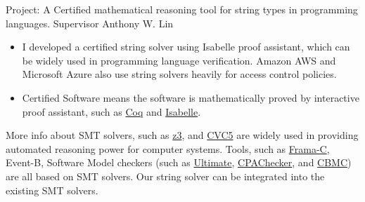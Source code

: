 \documentclass[a4paper,10pt]{memoir} %
\begin{document}


{
Project: A Certified mathematical reasoning tool for string types in programming languages. Supervisor Anthony W. Lin
\begin{itemize}
	
	\item I developed a certified string solver using Isabelle  proof assistant, which can be widely used in programming language verification. Amazon AWS and Microsoft Azure also use string solvers heavily for access control policies.

\item Certified Software means the software is mathematically proved by interactive proof assistant, such as \href{https://coq.inria.fr/}{Coq} and \href{https://isabelle.in.tum.de/}{Isabelle}. 
	

\end{itemize}

More info about
SMT solvers, such as \href{https://github.com/Z3Prover/z3}{z3}, and \href{https://cvc5.github.io/}{CVC5} are widely used in providing automated reasoning power for computer systems. Tools, such as \href{https://frama-c.com/}{Frama-C},  Event-B,  Software Model checkers (such as \href{https://monteverdi.informatik.uni-freiburg.de/tomcat/Website/}{Ultimate}, 
\href{https://cpachecker.sosy-lab.org/}{CPAChecker}, and \href{https://www.cprover.org/cbmc/}{CBMC}) are all based on SMT solvers. Our string solver can be integrated into the existing SMT solvers. 
}
\end{document}
